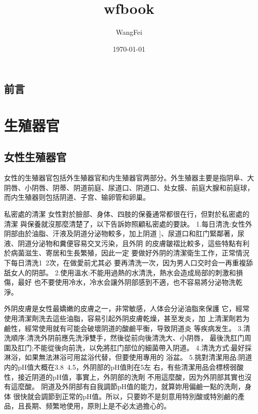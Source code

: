 \documentclass[12pt,UTF8]{ctexbook}
\title{\heiti\zihao{0} wfbook}
\author{WangFei}
\date{\today}
\begin{document}
\maketitle
\tableofcontents

\frontmatter

\chapter{前言}



\mainmatter

\part{生殖器官}

\chapter{女性生殖器官}

女性的生殖器官包括外生殖器官和内生殖器官两部分。外生殖器主要是指阴阜、大阴唇、小阴唇、阴蒂、阴道前庭、尿道口、阴道口、处女膜、前庭大腺和前庭球，而内生殖器则包括阴道、子宫、输卵管和卵巢。

私密處的清潔
女性對於臉部、身体、四肢的保養通常都很在行，但對於私密處的清潔
與保養就沒那麼清楚了，以下告訴妳照顧私密處的要訣。
1.每日清洗:女性外阴部由於油脂、汗液及阴道分泌物較多，加上阴道
]、尿道口和肛门緊鄰著，尿液、阴道分泌物和糞便容易交叉污染，且外阴
的皮膚皺褶比較多，這些特點有利於病菌滋生、寄居和生長繁殖，因此一定
要做好外阴的清潔衛生工作，正常情況下每日清洗1~2次，在做愛前尤其必
要再清洗一次，因为男人口交时会一再重複舔舐女人的阴部。
2.使用溫水:不能用過熱的水清洗，熱水会造成局部的刺激和損傷，最好
也不要使用冷水，冷水会讓外阴部感到不適，也不容易將分泌物洗乾淨。

外阴皮膚是女性最嬌嫩的皮膚之一，非常敏感，人体会分泌油脂來保護
它，經常使用清潔劑洗去這些油脂，容易引起外阴皮膚乾燥，甚至发炎，加
上清潔劑若为鹼性，經常使用就有可能会破壞阴道的酸鹼平衡，导致阴道炎
等疾病发生。
3.清洗順序:清洗外阴前應先洗淨雙手，然後從前向後清洗大、小阴唇，
最後洗肛门周圍及肛门;不能從後向前洗，以免將肛门部位的細菌帶入阴道。
4.清洗方式:最好採淋浴，如果無法淋浴可用盆浴代替，但要使用專用的
浴盆。
5.挑對清潔用品:阴道内的pH值大概在3.8~4.5，外阴部的pH值則在5左
右，有些清潔用品会標榜弱酸性，接近阴道的pH值，事實上，外阴部的洗劑
不用這麼酸，因为外阴部其實也沒有這麼酸。
阴道及外阴部有自我調節pH值的能力，就算妳用偏鹼一點的洗劑，身体
很快就会調節到正常的pH值。所以，只要妳不是刻意用特別酸或特別鹼的產
品，且長期、频繁地使用，原則上是不必太過擔心的。
\end{document}

